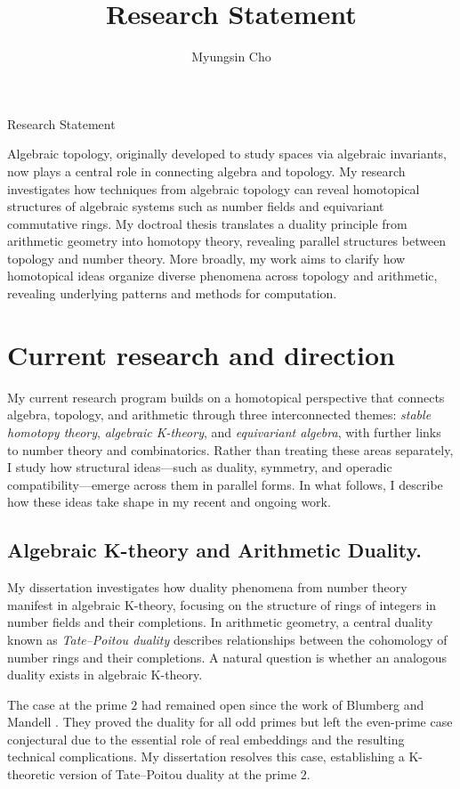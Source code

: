 \documentclass[11pt]{article}
\title{Research Statement}
\author{Myungsin Cho}
\date{}
\begin{document}
\begin{center}\LARGE{Research Statement}\end{center}\vspace{.5em}

Algebraic topology, originally developed to study spaces via algebraic invariants, now plays a central role in connecting algebra and topology.
My research investigates how techniques from algebraic topology can reveal homotopical structures of algebraic systems such as number fields and equivariant commutative rings.
My doctroal thesis translates a duality principle from arithmetic geometry into homotopy theory, revealing parallel structures between topology and number theory.
More broadly, my work aims to clarify how homotopical ideas organize diverse phenomena across topology and arithmetic, revealing underlying patterns and methods for computation.
\section{Current research and direction}

My current research program builds on a homotopical perspective that connects algebra, topology, and arithmetic through three interconnected themes: {\it stable homotopy theory}, {\it algebraic K-theory}, and {\it equivariant algebra}, with further links to number theory and combinatorics.
Rather than treating these areas separately, I study how structural ideas—such as duality, symmetry, and operadic compatibility—emerge across them in parallel forms.
In what follows, I describe how these ideas take shape in my recent and ongoing work.

\subsection{Algebraic K-theory and Arithmetic Duality.}
My dissertation investigates how duality phenomena from number theory manifest in algebraic K-theory, focusing on the structure of rings of integers in number fields and their completions.
In arithmetic geometry, a central duality known as {\it Tate–Poitou duality} describes relationships between the cohomology of number rings and their completions. 
A natural question is whether an analogous duality exists in algebraic K-theory.

The case at the prime $2$ had remained open since the work of Blumberg and Mandell \cite{MR4121155}. 
They proved the duality for all odd primes but left the even-prime case conjectural due to the essential role of real embeddings and the resulting technical complications.
My dissertation resolves this case, establishing a K-theoretic version of Tate–Poitou duality at the prime $2$.
\end{document}
